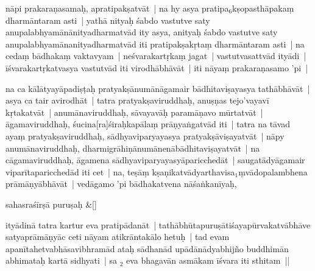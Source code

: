 \documentclass[article,12pt,a4paper]{memoir}%
\newcounter{parCount}
\begin{document}
	  
	  \pstart \leavevmode%
	\label{thakur75-38.14}nāpi prakaraṇasamaḥ, apratipakṣatvāt | na hy asya pratipa{\tiny $_{6}$}kṣopasthāpakaṃ dharmāntaram asti | \label{RNAms-add-1-start}yathā nityaḥ śabdo vastutve saty anupalabhyamā\label{ratnakīrtinibandhāvali__36r1PF7IMWHBAID9C9MEN8DPBJV}nānityadharmatvād\label{ratnakīrtinibandhāvali__36r1PF7IMWGLU1HYJ7TI9KDX9AW} ity asya, anityaḥ śabdo vastutve saty anupalabhyamānanityadharmatvād iti pratipakṣakṛtaṃ dharmāntaram asti |\label{RNAms-add-1-end} na cedaṃ bādhakaṃ vaktavyam | neśvarakartṛkaṃ jagat | vastutvasattvād ityādi | īśvarakartṛkatvasya vastutvād iti virodhābhāvāt | iti nāyaṃ prakaraṇasamo 'pi |
	{}
	\pend%
      

	  
	  \pstart \leavevmode%
	\label{thakur75-38.19}na ca kālātyayāpadiṣṭaḥ pratyakṣānumānāgamair bādhitaviṣayasya tathābhāvāt | asya ca tair avirodhāt | tatra pratyakṣaviruddhaḥ, anuṣṇas tejo'vayavī kṛtakatvāt | anumānavi\leavevmode{}\label{RNAms_22a}ruddhaḥ, sāvayavāḥ paramāṇavo mūrtatvāt | āgamaviruddhaḥ, śucina[ra]śiraḥkapālaṃ prāṇyaṅgatvād iti | tatra na tāvad ayaṃ pratyakṣaviruddhaḥ, sādhyaviparyayasya pratyakṣāviṣayatvāt | nāpy anumānaviruddhaḥ, dharmigrāhiṇānumānenābādhitaviṣayatvāt | na cāgamaviruddhaḥ, āgamena sādhyaviparyayasyāparicchedāt | saugatādyāgamair viparītaparicchedād iti cet | na, teṣāṃ kṣaṇikatvādyarthavisa{\tiny $_{1}$}ṃvādopalambhena prāmāṇyābhāvāt | vedāgamo 'pi bādhakatvena nāśaṅkanīyaḥ,
	{}
	\pend%
      
	    
	    \stanza[\smallbreak]
	  sahasraśīrṣā puruṣaḥ \&[\smallbreak]
	  
	  
	  

	  
	  \pstart \leavevmode%
	ityādinā tatra kartur eva pratipādanāt | tathābhūtapuruṣātiśayapūrvakatvābhāve satyaprāmāṇyāc ceti nāyam atikrāntakālo hetuḥ | tad evam apanītahetvabhāsavibhramād ataḥ sādhanād upādānādyabhijño buddhimān abhimataḥ kartā sidhyati | sa {\tiny $_{2}$} eva bhagavān asmākam īśvara iti sthitam ||
	{}
	\pend%
      
\end{document}
